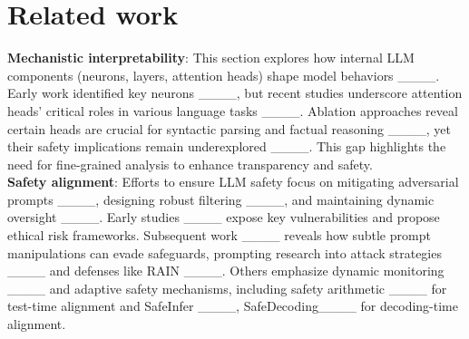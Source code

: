 \section{Related work}
\textbf{Mechanistic interpretability}: This section explores how internal LLM components (neurons, layers, attention heads) shape model behaviors ____. Early work identified key neurons ____, but recent studies underscore attention heads’ critical roles in various language tasks ____. Ablation approaches reveal certain heads are crucial for syntactic parsing and factual reasoning ____, yet their safety implications remain underexplored ____. This gap highlights the need for fine-grained analysis to enhance transparency and safety.\\
\textbf{Safety alignment}: Efforts to ensure LLM safety focus on mitigating adversarial prompts ____, designing robust filtering ____, and maintaining dynamic oversight ____. Early studies ____ expose key vulnerabilities and propose ethical risk frameworks. Subsequent work ____ reveals how subtle prompt manipulations can evade safeguards, prompting research into attack strategies ____ and defenses like RAIN ____. Others emphasize dynamic monitoring ____ and adaptive safety mechanisms, including safety arithmetic ____ for test-time alignment and SafeInfer ____, SafeDecoding____ for decoding-time alignment.
\vspace{-0.1cm}